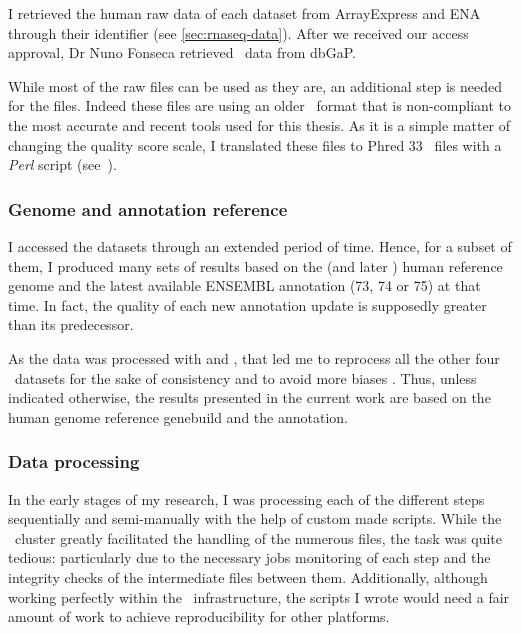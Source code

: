 I retrieved the human raw data of each dataset from \gls{ArrayExpress} and
\gls{ENA} through their identifier (see \cref{sec:rnaseq-data}). After we
received our access approval, Dr Nuno Fonseca retrieved \Gtex\ data from
\gls{dbGaP}.

While most of the raw files can be used as they are, an additional step is
needed for the  files. Indeed these files are using an older
\fastq\ format that is non-compliant to the most accurate and recent tools used
for this thesis.
As it is a simple matter of changing the quality score scale,
I translated these files to \gls{Phred} $33$ \fastq\ files with a
\emph{\gls{Perl}} script (see~).

\subsubsection{Genome and annotation reference}

I accessed the datasets through an extended period of time. Hence, for a subset of
them, I produced many sets of results based on the 
(and later )  human reference genome and the latest available ENSEMBL
annotation (73, 74 or 75) at that time.
In fact, the quality of each new annotation update is
supposedly greater than its predecessor.

As the  data was processed with  and , that led me
to reprocess all the other four \Rnaseq\ datasets for the sake of consistency and
to avoid more biases . Thus, unless indicated
otherwise, the results presented in the current work are
based on the  human genome reference genebuild and the 
annotation.


\subsubsection{Data processing}

In the early stages of my research, I was processing each of the different steps
sequentially and semi-manually with the help of custom made scripts. While the
\EBI\ \gls{cluster} greatly facilitated the handling of the numerous files,
the task was quite tedious: particularly due to the necessary jobs monitoring of
each step and the integrity checks of the intermediate files between them.
Additionally, although working perfectly within the \EBI\ infrastructure,
the scripts I wrote would need a fair amount of work to achieve reproducibility
for other platforms.

